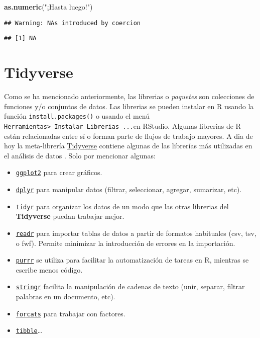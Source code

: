 \documentclass[
]{book}
\newenvironment{Shaded}{\begin{snugshade}}{\end{snugshade}}
\newcommand{\KeywordTok}[1]{\textcolor[rgb]{0.13,0.29,0.53}{\textbf{#1}}}
\newcommand{\NormalTok}[1]{#1}
\newcommand{\StringTok}[1]{\textcolor[rgb]{0.31,0.60,0.02}{#1}}
\providecommand{\tightlist}{%
  \setlength{\itemsep}{0pt}\setlength{\parskip}{0pt}}
\begin{document}
\begin{Shaded}
\begin{Highlighting}[]
\KeywordTok{as.numeric}\NormalTok{(}\StringTok{"¡Hasta luego!"}\NormalTok{)}
\end{Highlighting}
\end{Shaded}

\begin{verbatim}
## Warning: NAs introduced by coercion
\end{verbatim}

\begin{verbatim}
## [1] NA
\end{verbatim}

\hypertarget{tidyverse}{%
\section{Tidyverse}\label{tidyverse}}

Como se ha mencionado anteriormente, las librerias o \emph{paquetes} son colecciones de funciones y/o conjuntos de datos. Las librerias se pueden instalar en R usando la función \texttt{install.packages()} o usando el menú \texttt{Herramientas\textgreater{}\ Instalar\ Librerias\ ...}en RStudio.
Algunas librerias de R están relacionadas entre sí o forman parte de flujos de trabajo mayores. A dia de hoy la meta-librería \href{https://www.tidyverse.org/}{Tidyverse} contiene algunas de las librerías más utilizadas en el análisis de datos \citep{wickham2019tidyverse}. Solo por mencionar algunas:

\begin{itemize}
\tightlist
\item
  \href{https://ggplot2.tidyverse.org/}{\texttt{ggplot2}} para crear gráficos.
\item
  \href{https://dplyr.tidyverse.org/}{\texttt{dplyr}} para manipular datos (filtrar, seleccionar, agregar, sumarizar, etc).
\item
  \href{https://tidyr.tidyverse.org/}{\texttt{tidyr}} para organizar los datos de un modo que las otras librerias del \textbf{Tidyverse} puedan trabajar mejor.
\item
  \href{https://readr.tidyverse.org/}{\texttt{readr}} para importar tablas de datos a partir de formatos habituales (csv, tsv, o fwf). Permite minimizar la introducción de errores en la importación.
\item
  \href{https://purrr.tidyverse.org/}{\texttt{purrr}} se utiliza para facilitar la automatización de tareas en R, mientras se escribe menos código.
\item
  \href{https://stringr.tidyverse.org/}{\texttt{stringr}} facilita la manipulación de cadenas de texto (unir, separar, filtrar palabras en un documento, etc).
\item
  \href{https://forcats.tidyverse.org/}{\texttt{forcats}} para trabajar con factores.
\item
  \href{https://tibble.tidyverse.org/}{\texttt{tibble}}\ldots{}
\end{itemize}
\end{document}

